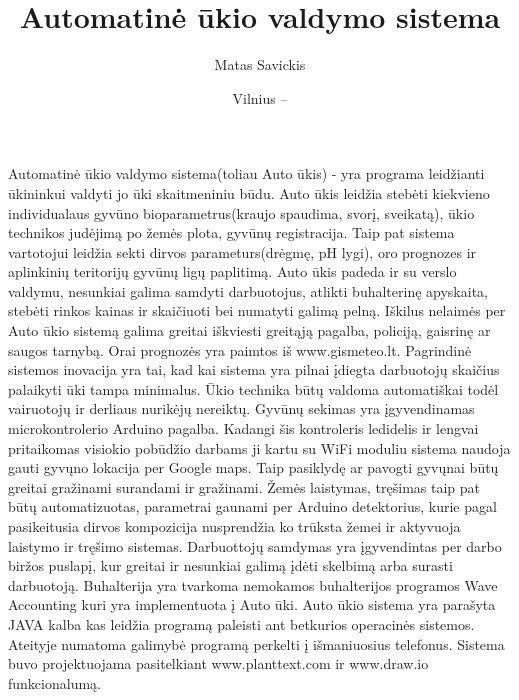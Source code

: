 \documentclass[oneside]{VUMIFPSkursinis}
\title{Automatinė ūkio valdymo sistema}
\author{Matas Savickis}
\date{Vilnius – \the\year}
\begin{document}
\maketitle

\tableofcontents



Automatinė ūkio valdymo sistema(toliau Auto ūkis) - yra programa leidžianti ūkininkui valdyti jo ūki skaitmeniniu būdu. Auto ūkis  leidžia stebėti kiekvieno individualaus gyvūno bioparametrus(kraujo spaudima, svorį, sveikatą), ūkio technikos judėjimą po žemės plota, gyvūnų registracija. Taip pat sistema vartotojui leidžia sekti dirvos parameturs(drėgmę, pH lygi),  oro prognozes ir aplinkinių teritorijų gyvūnų ligų paplitimą. Auto ūkis padeda ir su verslo valdymu, nesunkiai galima samdyti darbuotojus, atlikti buhalterinę apyskaita, stebėti rinkos kainas ir skaičiuoti bei numatyti galimą pelną. Iškilus nelaimės per Auto ūkio sistemą galima greitai iškviesti greitąją pagalba, policiją, gaisrinę ar saugos tarnybą. Orai prognozės yra paimtos iš www.gismeteo.lt. Pagrindinė sistemos inovacija yra tai, kad kai sistema yra pilnai įdiegta darbuotojų skaičius palaikyti ūki tampa minimalus. Ūkio technika būtų valdoma automatiškai todėl vairuotojų ir derliaus nurikėjų nereiktų. Gyvūnų sekimas yra įgyvendinamas microkontrolerio Arduino pagalba. Kadangi šis kontroleris ledidelis ir lengvai pritaikomas visiokio pobūdžio darbams ji kartu su WiFi moduliu sistema naudoja gauti gyvųno lokacija per Google maps. Taip pasiklydę ar pavogti gyvųnai būtų greitai gražinami surandami ir gražinami. Žemės laistymas, tręšimas taip pat būtų automatizuotas, parametrai gaunami per Arduino detektorius, kurie pagal pasikeitusia dirvos kompozicija nusprendžia ko trūksta žemei ir aktyvuoja laistymo ir tręšimo sistemas. Darbuottojų samdymas yra įgyvendintas per darbo biržos puslapį, kur greitai ir nesunkiai galimą įdėti skelbimą arba surasti darbuotoją. Buhalterija yra tvarkoma nemokamos buhalterijos programos Wave Accounting kuri yra implementuota į Auto ūki.  Auto ūkio sistema yra parašyta JAVA kalba kas leidžia programą paleisti ant betkurios operacinės sistemos. Ateityje numatoma galimybė programą perkelti į išmaniuosius telefonus. Sistema buvo projektuojama pasitelkiant www.planttext.com ir www.draw.io funkcionalumą.
\end{document}
